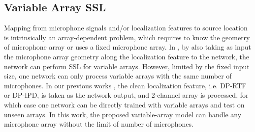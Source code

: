 \documentclass[lettersize,journal]{IEEEtran}
\begin{document}
\subsection{Variable Array SSL}
Mapping from microphone signals and/or localization features to source location is intrinsically an array-dependent problem, which requires to know the geometry of microphone array or uses a fixed microphone array. 
In \cite{Kowalk2022GeometryAwareDE}, by also taking as input the microphone array geometry along the localization feature to the network, the network can perform SSL for variable arrays. However, limited by the fixed input size, one network can only process variable arrays with the same number of microphones. In our previous works \cite{yang2021learning, Yang2022SRPDNNLD}, the clean localization feature, i.e. DP-RTF or DP-IPD, is taken as the network output, and 2-channel array is processed, for which case one network can be directly trained with variable arrays and test on unseen arrays. In this work, the proposed variable-array model can handle any microphone array without the limit of number of microphones. 

\end{document}
